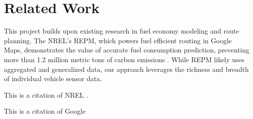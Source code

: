 \documentclass[letterpaper]{article}
\begin{document}
\section{Related Work}

This project builds upon existing research in fuel economy modeling and route planning. 
The NREL's REPM, which powers fuel efficient routing in Google Maps, demonstrates the value of accurate fuel consumption prediction, preventing more than 1.2 million metric tons of carbon emissions \cite{google_2023_environmental_report}.
While REPM likely uses aggregated and generalized data, our approach leverages the richness and breadth of individual vehicle sensor data.



This is a citation of NREL \cite{nrel_routee}.

This is a citation of Google \cite{google_2023_environmental_report}


 

\end{document}
